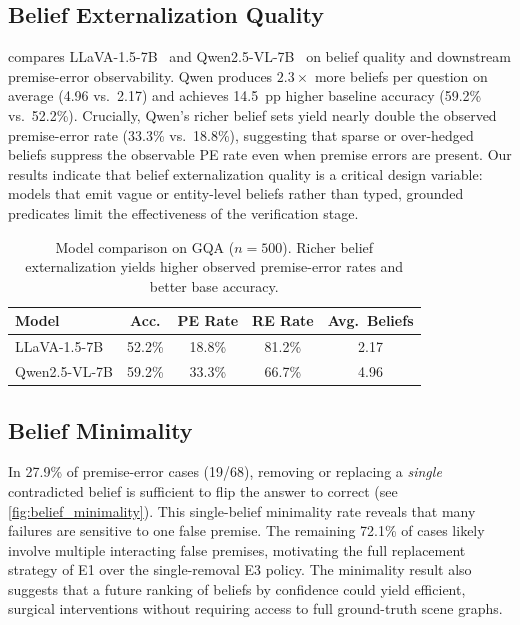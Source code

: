 \subsection{Belief Externalization Quality}
\label{sec:belief_quality}

 compares LLaVA-1.5-7B~\cite{liu2023visual} and
Qwen2.5-VL-7B~\cite{bai2025qwen} on belief quality and downstream premise-error
observability. Qwen produces $2.3{\times}$ more beliefs per question on average
(4.96 vs.\ 2.17) and achieves 14.5~pp higher baseline accuracy (59.2\% vs.\ 52.2\%).
Crucially, Qwen's richer belief sets yield nearly double the observed premise-error
rate (33.3\% vs.\ 18.8\%), suggesting that sparse or over-hedged beliefs suppress
the observable PE rate even when premise errors are present.
Our results indicate that belief externalization quality is a critical design variable:
models that emit vague or entity-level beliefs rather than typed, grounded predicates
limit the effectiveness of the verification stage.

\begin{table}[h]
\centering
\caption{Model comparison on GQA ($n{=}500$). Richer belief externalization
yields higher observed premise-error rates and better base accuracy.}
\label{tab:model_compare}
\small
\setlength{\tabcolsep}{4pt}
\begin{tabular}{lcccc}
\toprule
\textbf{Model} & \textbf{Acc.} & \textbf{PE Rate} & \textbf{RE Rate}
  & \textbf{Avg.\ Beliefs} \\
\midrule
LLaVA-1.5-7B  & 52.2\% & 18.8\% & 81.2\% & 2.17 \\
Qwen2.5-VL-7B & 59.2\% & 33.3\% & 66.7\% & 4.96 \\
\bottomrule
\end{tabular}
\end{table}

\subsection{Belief Minimality}

In 27.9\% of premise-error cases (19/68), removing or replacing a \emph{single}
contradicted belief is sufficient to flip the answer to correct
(see \cref{fig:belief_minimality}). This single-belief
minimality rate reveals that many failures are sensitive to one false premise.
The remaining 72.1\% of cases likely involve multiple interacting false premises,
motivating the full replacement strategy of E1 over the single-removal E3 policy.
The minimality result also suggests that a future ranking of beliefs by confidence
could yield efficient, surgical interventions without requiring access to full
ground-truth scene graphs.

